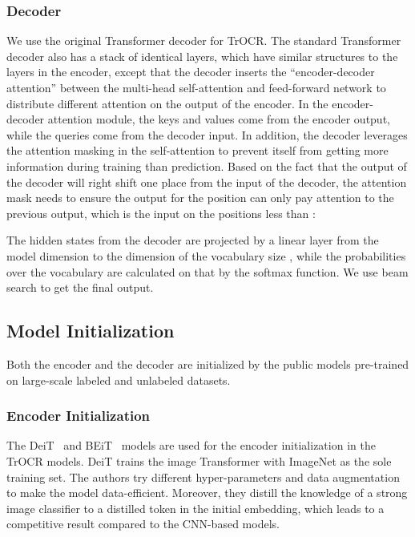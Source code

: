 \documentclass[letterpaper]{article} \usepackage{aaai23}  \usepackage{times}  \usepackage{helvet}  \usepackage{courier}  \usepackage[hyphens]{url}  \usepackage{graphicx} \urlstyle{rm} \def\UrlFont{\rm}  \usepackage{natbib}  \usepackage{caption} \frenchspacing  \setlength{\pdfpagewidth}{8.5in} \setlength{\pdfpageheight}{11in} \usepackage{algorithm}
\begin{document}
\subsubsection{Decoder}
\label{sec:decoder}

We use the original Transformer decoder for TrOCR. The standard Transformer decoder also has a stack of identical layers, which have similar structures to the layers in the encoder, except that the decoder inserts the ``encoder-decoder attention'' between the multi-head self-attention and feed-forward network to distribute different attention on the output of the encoder. In the encoder-decoder attention module, the keys and values come from the encoder output, while the queries come from the decoder input. In addition, the decoder leverages the attention masking in the self-attention to prevent itself from getting more information during training than prediction. Based on the fact that the output of the decoder will right shift one place from the input of the decoder, the attention mask needs to ensure the output for the position  can only pay attention to the previous output, which is the input on the positions less than :




The hidden states from the decoder are projected by a linear layer from the model dimension to the dimension of the vocabulary size , while the probabilities over the vocabulary are calculated on that by the softmax function. We use beam search to get the final output.


\subsection{Model Initialization}
Both the encoder and the decoder are initialized by the public models pre-trained on large-scale labeled and unlabeled datasets.

\subsubsection{Encoder Initialization}

The DeiT~\cite{touvron2020deit} and BEiT~\cite{bao2021beit} models are used for the encoder initialization in the TrOCR models.
DeiT trains the image Transformer with ImageNet \cite{deng2009imagenet} as the sole training set. The authors try different hyper-parameters and data augmentation to make the model data-efficient. Moreover, they distill the knowledge of a strong image classifier to a distilled token in the initial embedding, which leads to a competitive result compared to the CNN-based models.
\end{document}
